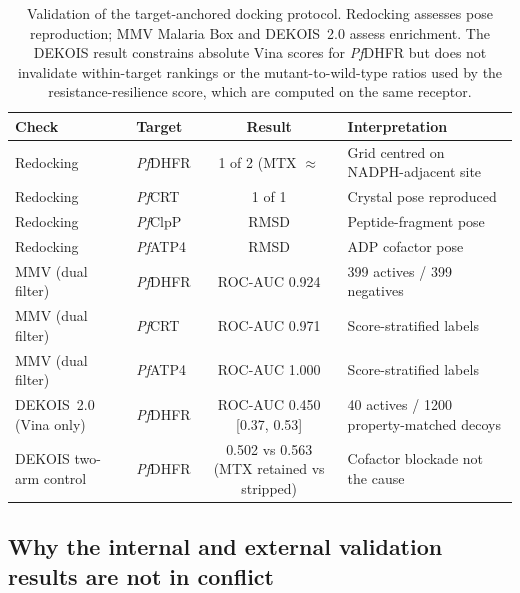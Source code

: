 \begin{table}[htbp]
	\centering
	\caption[Docking protocol validation]{Validation of the target-anchored docking protocol. Redocking assesses pose reproduction; MMV Malaria Box and DEKOIS~2.0 assess enrichment. The DEKOIS result constrains absolute Vina scores for \emph{Pf}DHFR but does not invalidate within-target rankings or the mutant-to-wild-type ratios used by the resistance-resilience score, which are computed on the same receptor.}
	\label{tab:res_p1_validation}
	\small
	\begin{tabularx}{\textwidth}{l l c X}
		\toprule
		Check & Target & Result & Interpretation \\
		\midrule
		Redocking & \emph{Pf}DHFR & 1 of 2 (MTX $\approx$ \qty{30}{\ang}) & Grid centred on NADPH-adjacent site \\
		Redocking & \emph{Pf}CRT & 1 of 1 & Crystal pose reproduced \\
		Redocking & \emph{Pf}ClpP & RMSD \qty{1.65}{\ang} & Peptide-fragment pose \\
		Redocking & \emph{Pf}ATP4 & RMSD \qty{1.23}{\ang} & ADP cofactor pose \\
		MMV (dual filter) & \emph{Pf}DHFR & ROC-AUC \num{0.924} & 399 actives / 399 negatives \\
		MMV (dual filter) & \emph{Pf}CRT & ROC-AUC \num{0.971} & Score-stratified labels \\
		MMV (dual filter) & \emph{Pf}ATP4 & ROC-AUC \num{1.000} & Score-stratified labels \\
		DEKOIS~2.0 (Vina only) & \emph{Pf}DHFR & ROC-AUC \num{0.450} [\num{0.37}, \num{0.53}] & 40 actives / \num{1200} property-matched decoys \\
		DEKOIS two-arm control & \emph{Pf}DHFR & \num{0.502} vs \num{0.563} (MTX retained vs stripped) & Cofactor blockade not the cause \\
		\bottomrule
	\end{tabularx}
\end{table}

\subsection{Why the internal and external validation results are not in conflict}\label{sec:res_validation_discussion}

